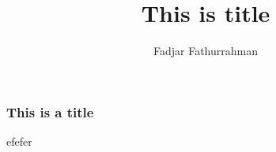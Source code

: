 \documentclass[aspectratio=169]{beamer}
\begin{document}
\title{This is title}
\author{Fadjar Fathurrahman}
\maketitle

\frame{\titlepage}

\begin{frame}
\frametitle{This is a title}

efefer

\end{frame}
\end{document}
